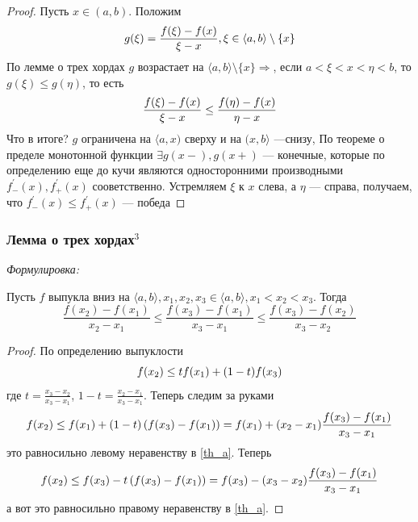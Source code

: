 \documentclass{article}
\begin{document}
    \begin{proof}
    Пусть $x \in (a, b)$. Положим 
    \begin{equation}
    g(\xi) = \frac{f(\xi) - f(x)} {\xi - x}, \xi \in\langle a, b \rangle \setminus \{x\} \notag
    \end{equation}
    По лемме о трех хордах $g$ возрастает на $\langle a, b \rangle \setminus \{x\} \Rightarrow$, если $ a < \xi < x < \eta < b$, то $g(\xi) \leq g(\eta)$, то есть
    \begin{equation}
    \frac{f(\xi) - f(x)} {\xi - x} \leq \frac{f(\eta) - f(x)} {\eta - x}\notag
    \end{equation}
    Что в итоге? $g$ ограничена на $\langle a, x)$ сверху и на $(x, b\rangle$ ---снизу, По теореме о пределе монотонной функции $\exists g(x-), g(x+)$ --- конечные, которые по определению еще до кучи являются односторонними производными $ f^{'}_{-} (x), f^{'}_{+} (x)$ сооветственно. Устремляем $\xi$ к $x$ слева, а $\eta$ --- справа, получаем, что $ f^{'}_{-} (x) \leq f^{'}_{+} (x)$ --- победа
    \end{proof}

\subsubsection{Лемма о трех хордах\texorpdfstring{$^3$}{}}
\textit{Формулировка: }

Пусть $f$ выпукла вниз на $\langle a, b\rangle, x_1, x_2, x_3 \in \langle a, b\rangle, x_1<x_2<x_3$. Тогда 
\begin{equation} \label{th_a}
\frac{f(x_2) - f(x_1)} {x_2 - x_1} \leq \frac{f(x_3) - f(x_1)} {x_3 - x_1} \leq \frac{f(x_3) - f(x_2)} {x_3 - x_2}
\end{equation}

\begin{proof}
По определению выпуклости 
\begin{equation}
f(x_2) \leq t f(x_1) + (1-t)f(x_3) \notag
\end{equation}
где $t = \frac{x_3 - x_2} {x_3 - x_1}$, $1 - t = \frac{x_2 - x_1} {x_3 - x_1}$. Теперь следим за руками
\begin{equation}
f(x_2) \leq f(x_1) + (1-t)\left(f(x_3) - f(x_1)\right) = f(x_1) + (x_2 - x_1) \frac{f(x_3) - f(x_1)} {x_3 - x_1} \notag
\end{equation}
это равносильно левому неравенству в \eqref{th_a}. Теперь 
\begin{equation}
f(x_2) \leq f(x_3) - t\left(f(x_3) - f(x_1)\right) = f(x_3) - (x_3 - x_2) \frac{f(x_3) - f(x_1)} {x_3 - x_1} \notag
\end{equation}
а вот это равносильно правому неравенству в \eqref{th_a}.
\end{proof}
\end{document}
